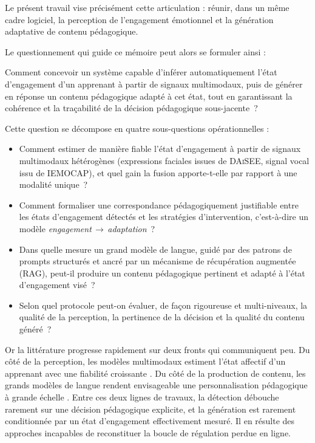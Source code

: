 Le présent travail vise précisément cette articulation : réunir, dans un
même cadre logiciel, la perception de l'engagement émotionnel et la
génération adaptative de contenu pédagogique.

Le questionnement qui guide ce mémoire peut alors se formuler ainsi :

\begin{center}
Comment concevoir un système capable d'inférer automatiquement
l'état d'engagement d'un apprenant à partir de signaux multimodaux, puis de
générer en réponse un contenu pédagogique adapté à cet état, tout en
garantissant la cohérence et la traçabilité de la décision pédagogique
sous-jacente~?
\end{center}

Cette question se décompose en quatre sous-questions opérationnelles :

\begin{itemize}
  \item Comment estimer de manière fiable l'état d'engagement à partir de
  signaux multimodaux hétérogènes (expressions faciales issues de
  \textsc{DAiSEE}, signal vocal issu de \textsc{IEMOCAP}), et quel gain la
  fusion apporte-t-elle par rapport à une modalité unique~?

  \item Comment formaliser une correspondance pédagogiquement justifiable
  entre les états d'engagement détectés et les stratégies d'intervention,
  c'est-à-dire un modèle \emph{engagement\,$\rightarrow$\,adaptation}~?

  \item Dans quelle mesure un grand modèle de langue, guidé par des patrons
  de prompts structurés et ancré par un mécanisme de récupération augmentée
  (RAG), peut-il produire un contenu pédagogique pertinent et adapté à l'état
  d'engagement visé~?

  \item Selon quel protocole peut-on évaluer, de façon rigoureuse et
  multi-niveaux, la qualité de la perception, la pertinence de la décision et
  la qualité du contenu généré~?
\end{itemize}

Or la littérature progresse rapidement sur deux fronts qui communiquent peu.
Du côté de la perception, les modèles multimodaux estiment l'état affectif
d'un apprenant avec une fiabilité croissante
\cite{dmello2015review,whitehill2014faces,gupta2016daisee}. Du côté de la
production de contenu, les grands modèles de langue rendent envisageable une
personnalisation pédagogique à grande échelle
\cite{brown2020language,kasneci2023chatgpt}. Entre ces deux lignes de
travaux, la détection débouche rarement sur une décision pédagogique
explicite, et la génération est rarement conditionnée par un état
d'engagement effectivement mesuré. Il en résulte des approches incapables
de reconstituer la boucle de régulation perdue en ligne.

